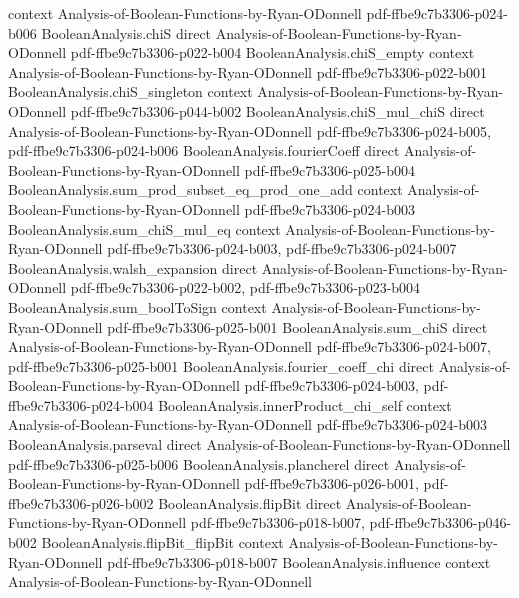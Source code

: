 \begin{theorem}
  {context}
  {Analysis-of-Boolean-Functions-by-Ryan-ODonnell}
  {pdf-ffbe9c7b3306-p024-b006}
\proofstep
  {BooleanAnalysis.chiS}
  {direct}
  {Analysis-of-Boolean-Functions-by-Ryan-ODonnell}
  {pdf-ffbe9c7b3306-p022-b004}
\proofstep
  {BooleanAnalysis.chiS_empty}
  {context}
  {Analysis-of-Boolean-Functions-by-Ryan-ODonnell}
  {pdf-ffbe9c7b3306-p022-b001}
\proofstep
  {BooleanAnalysis.chiS_singleton}
  {context}
  {Analysis-of-Boolean-Functions-by-Ryan-ODonnell}
  {pdf-ffbe9c7b3306-p044-b002}
\proofstep
  {BooleanAnalysis.chiS_mul_chiS}
  {direct}
  {Analysis-of-Boolean-Functions-by-Ryan-ODonnell}
  {pdf-ffbe9c7b3306-p024-b005,
    pdf-ffbe9c7b3306-p024-b006}
\proofstep
  {BooleanAnalysis.fourierCoeff}
  {direct}
  {Analysis-of-Boolean-Functions-by-Ryan-ODonnell}
  {pdf-ffbe9c7b3306-p025-b004}
\proofstep
  {BooleanAnalysis.sum_prod_subset_eq_prod_one_add}
  {context}
  {Analysis-of-Boolean-Functions-by-Ryan-ODonnell}
  {pdf-ffbe9c7b3306-p024-b003}
\proofstep
  {BooleanAnalysis.sum_chiS_mul_eq}
  {context}
  {Analysis-of-Boolean-Functions-by-Ryan-ODonnell}
  {pdf-ffbe9c7b3306-p024-b003,
    pdf-ffbe9c7b3306-p024-b007}
\proofstep
  {BooleanAnalysis.walsh_expansion}
  {direct}
  {Analysis-of-Boolean-Functions-by-Ryan-ODonnell}
  {pdf-ffbe9c7b3306-p022-b002,
    pdf-ffbe9c7b3306-p023-b004}
\proofstep
  {BooleanAnalysis.sum_boolToSign}
  {context}
  {Analysis-of-Boolean-Functions-by-Ryan-ODonnell}
  {pdf-ffbe9c7b3306-p025-b001}
\proofstep
  {BooleanAnalysis.sum_chiS}
  {direct}
  {Analysis-of-Boolean-Functions-by-Ryan-ODonnell}
  {pdf-ffbe9c7b3306-p024-b007,
    pdf-ffbe9c7b3306-p025-b001}
\proofstep
  {BooleanAnalysis.fourier_coeff_chi}
  {direct}
  {Analysis-of-Boolean-Functions-by-Ryan-ODonnell}
  {pdf-ffbe9c7b3306-p024-b003,
    pdf-ffbe9c7b3306-p024-b004}
\proofstep
  {BooleanAnalysis.innerProduct_chi_self}
  {context}
  {Analysis-of-Boolean-Functions-by-Ryan-ODonnell}
  {pdf-ffbe9c7b3306-p024-b003}
\proofstep
  {BooleanAnalysis.parseval}
  {direct}
  {Analysis-of-Boolean-Functions-by-Ryan-ODonnell}
  {pdf-ffbe9c7b3306-p025-b006}
\proofstep
  {BooleanAnalysis.plancherel}
  {direct}
  {Analysis-of-Boolean-Functions-by-Ryan-ODonnell}
  {pdf-ffbe9c7b3306-p026-b001,
    pdf-ffbe9c7b3306-p026-b002}
\proofstep
  {BooleanAnalysis.flipBit}
  {direct}
  {Analysis-of-Boolean-Functions-by-Ryan-ODonnell}
  {pdf-ffbe9c7b3306-p018-b007,
    pdf-ffbe9c7b3306-p046-b002}
\proofstep
  {BooleanAnalysis.flipBit_flipBit}
  {context}
  {Analysis-of-Boolean-Functions-by-Ryan-ODonnell}
  {pdf-ffbe9c7b3306-p018-b007}
\proofstep
  {BooleanAnalysis.influence}
  {context}
  {Analysis-of-Boolean-Functions-by-Ryan-ODonnell}

\end{theorem}
